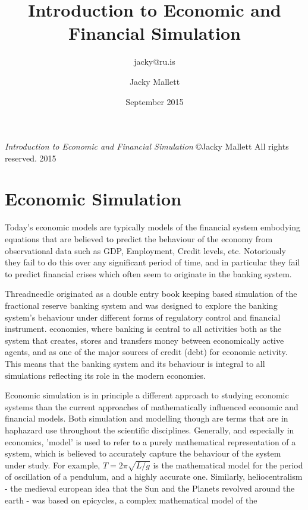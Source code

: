 \documentclass[10pt,oneside,openright, a4paper]{memoir}
\author{jacky@ru.is}
\author{Jacky Mallett}
\title{Introduction to Economic and Financial Simulation}
\date{September 2015}
\makeatletter
\def\maketitle{%
  \null
  \thispagestyle{empty}%
  \vfill
  \begin{center}\leavevmode
    \normalfont
    {\huge\raggedright \@title\par}%
    \hrulefill\par
    {\LARGE\raggedleft \@author\par}%
    \vskip 1cm
  \end{center}%
  \vfill
  \null
  \cleardoublepage
  }
\makeatother
\begin{document}
\let\cleardoublepage\clearpage
\maketitle
\frontmatter
\null\vfill
\begin{flushleft}
\textit{Introduction to Economic and Financial Simulation}
\copyright Jacky Mallett
All rights reserved. 2015
\bigskip
\end{flushleft}
\let\cleardoublepage\clearpage

\mainmatter
\sloppy
\chapter{Economic Simulation}
Today's economic models
are typically models of the financial system embodying
equations that are believed to predict the behaviour of the 
economy from
observational data such as GDP, Employment, Credit levels, etc.
Notoriously they fail to do this over any significant period of time,
and in particular they fail to predict financial crises which
often seem to originate in the banking system.
\par
Threadneedle originated as a double entry book keeping based simulation 
of the fractional reserve banking
system and was designed to explore the banking system's behaviour
under different forms of regulatory control and financial instrument.
economies, where banking is central to all activities both as
the system that creates, stores and transfers money between economically
active agents, and as one of the major sources 
of credit (debt) for economic activity. 
This means that the banking system and its behaviour is integral
to all simulations reflecting
its role in the modern economies. 
\par
Economic simulation is in principle a different approach to
studying economic systems than the current approaches of
mathematically influenced economic and financial
models.
Both simulation and modelling though are terms that are in
haphazard use throughout the scientific disciplines. 
Generally, and especially in economics, 'model' is used to refer to a 
purely mathematical
representation of a system, which is believed to accurately capture
the behaviour of the system under study. For example, $T = 2\pi\sqrt{L/g}$
is the mathematical model for the period of oscillation of a pendulum, 
and a highly accurate one. Similarly, heliocentralism - the
medieval european idea that the Sun and the Planets revolved around
the earth - was based on epicycles, a complex mathematical model of the
\end{document}
